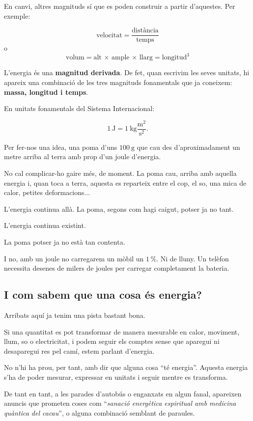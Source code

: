 En canvi, altres magnituds sí que es poden construir a partir d'aquestes. Per exemple:

\[
\text{velocitat}=\frac{\text{distància}}{\text{temps}}
\]
o
\[
\text{volum}=\text{alt × ample × llarg} = \text{longitud}^{3} 
\]

L'energia és una \textbf{magnitud derivada}. De fet, quan escrivim les seves unitats, hi apareix una combinació de les tres magnituds fonamentals que ja coneixem: \textbf{massa, longitud i temps}.

En unitats fonamentals del Sistema Internacional:

\[
1\ \mathrm{J}
=
1\ \mathrm{kg}
\frac{\mathrm{m}^{2}}{\mathrm{s}^{2}}.
\]

Per fer-nos una idea, una poma d'uns $100\ \mathrm{g}$ que cau des d'aproximadament un metre arriba al terra amb prop d'un joule d'energia.

No cal complicar-ho gaire més, de moment. La poma cau, arriba amb aquella energia i, quan toca a terra, aquesta es reparteix entre el cop, el so, una mica de calor, petites deformacions...

L'energia continua allà. La poma, segons com hagi caigut, potser ja no tant.

L'energia continua existint.

La poma potser ja no està tan contenta.

I no, amb un joule no carregarem un mòbil un $1\,\%$. Ni de lluny. Un telèfon necessita desenes de milers de joules per carregar completament la bateria.

\subsection{I com sabem que una cosa és energia?}

Arribats aquí ja tenim una pista bastant bona.

Si una quantitat es pot transformar de manera mesurable en calor, moviment, llum, so o electricitat, i podem seguir els comptes sense que aparegui ni desaparegui res pel camí, estem parlant d'energia.

No n'hi ha prou, per tant, amb dir que alguna cosa ``té energia''. Aquesta energia s'ha de poder mesurar, expressar en unitats i seguir mentre es transforma.

De tant en tant, a les parades d'autobús o enganxats en algun fanal, apareixen anuncis que prometen coses com ``\textit{sanació energètica espiritual amb medicina quàntica del cacau}'', o alguna combinació semblant de paraules.

